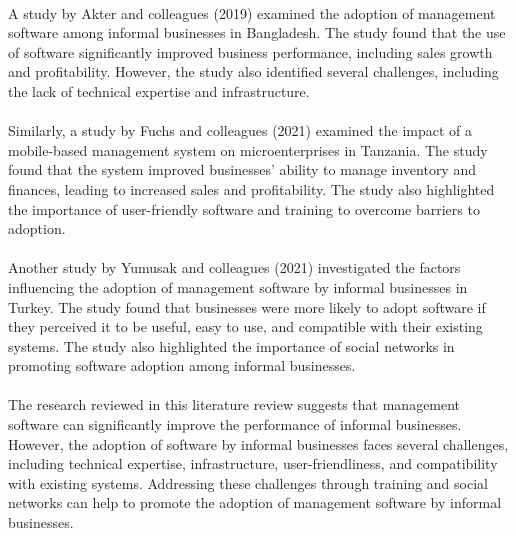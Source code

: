 \documentclass{article}
\begin{document}
\paragraph*{}
A study by Akter and colleagues (2019) examined the adoption of management software among informal businesses in Bangladesh. The study found that the use of software significantly improved business performance, including sales growth and profitability. However, the study also identified several challenges, including the lack of technical expertise and infrastructure.

\paragraph*{}
Similarly, a study by Fuchs and colleagues (2021) examined the impact of a mobile-based management system on microenterprises in Tanzania. The study found that the system improved businesses' ability to manage inventory and finances, leading to increased sales and profitability. The study also highlighted the importance of user-friendly software and training to overcome barriers to adoption.

\paragraph*{}
Another study by Yumusak and colleagues (2021) investigated the factors influencing the adoption of management software by informal businesses in Turkey. The study found that businesses were more likely to adopt software if they perceived it to be useful, easy to use, and compatible with their existing systems. The study also highlighted the importance of social networks in promoting software adoption among informal businesses.

\paragraph*{}
The research reviewed in this literature review suggests that management software can significantly improve the performance of informal businesses. However, the adoption of software by informal businesses faces several challenges, including technical expertise, infrastructure, user-friendliness, and compatibility with existing systems. Addressing these challenges through training and social networks can help to promote the adoption of management software by informal businesses.


\newpage

\end{document}
